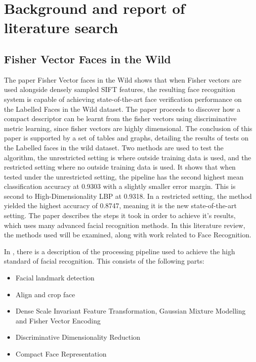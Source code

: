 \documentclass[12pt, a4paper]{article}
\begin{document}
\newpage
\section{Background and report of literature search}
\subsection{Fisher Vector Faces in the Wild}
The paper Fisher Vector faces in the Wild \cite{simonyan2004fisher} shows that when Fisher vectors are used alongside densely sampled SIFT features, the resulting face recognition system is capable of achieving state-of-the-art face verification performance on the Labelled Faces in the Wild \cite{labelledFaces} dataset. The paper proceeds to discover how a compact descriptor can be learnt from the fisher vectors using discriminative metric learning, since fisher vectors are highly dimensional. The conclusion of this paper is supported by a set of tables and graphs, detailing the results of tests on the Labelled faces in the wild dataset. Two methods are used to test the algorithm, the unrestricted setting is where outside training data is used, and the restricted setting where no outside training data is used. It shows that when tested under the unrestricted setting, the pipeline has the second highest mean classification accuracy at 0.9303 with a slightly smaller error margin. This is second to High-Dimensionality LBP at 0.9318. In a restricted setting, the method yielded the highest accuracy of 0.8747, meaning it is the new state-of-the-art setting. The paper describes the steps it took in order to achieve it’s results, which uses many advanced facial recognition methods. In this literature review, the methods used will be examined, along with work related to Face Recognition.

In \cite{simonyan2004fisher}, there is a description of the processing pipeline used to achieve the high standard of facial recognition. This consists of the following parts:
\begin{itemize}
\item Facial landmark detection
\item Align and crop face
\item Dense Scale Invariant Feature Transformation, Gaussian Mixture Modelling and Fisher Vector Encoding
\item Discriminative Dimensionality Reduction
\item Compact Face Representation
\end{itemize}
\end{document}
